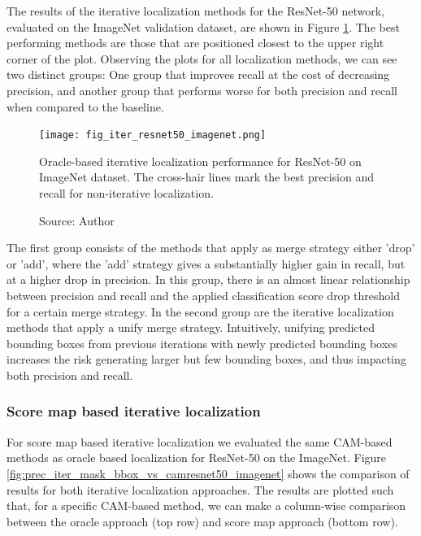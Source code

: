 The results of the iterative localization methods for the ResNet-50 network, evaluated on the ImageNet validation dataset, are shown in Figure \ref{fig:prec_iter_resnet50_imagenet}. The best performing methods are those that are positioned closest to the upper right corner of the plot. Observing the plots for all localization methods, we can see two distinct groups: One group that improves recall at the cost of decreasing precision, and another group that performs worse for both precision and recall when compared to the baseline.

\begin{figure}[h]
    \begin{center}       
    \texttt{[image: fig\_iter\_resnet50\_imagenet.png]}
    \caption[Oracle-based iterative localization performance for ResNet-50 on ImageNet dataset]{Oracle-based iterative localization performance for ResNet-50 on ImageNet dataset. The cross-hair lines mark the best precision and recall for non-iterative localization.}
    \caption*{Source: Author}
    \label{fig:prec_iter_resnet50_imagenet}
    \end{center}
\end{figure}

The first group consists of the methods that apply as merge strategy either 'drop' or 'add', where the 'add' strategy gives a substantially higher gain in recall, but at a higher drop in precision. In this group, there is an almost linear relationship between precision and recall and the applied classification score drop threshold for a certain merge strategy. In the second group are the iterative localization methods that apply a unify merge strategy. Intuitively, unifying predicted bounding boxes from previous iterations with newly predicted bounding boxes increases the risk generating larger but few bounding boxes, and thus impacting both precision and recall.

\subsubsection{Score map based iterative localization}

For score map based iterative localization we evaluated the same CAM-based methods as oracle based localization for ResNet-50 on the ImageNet. Figure \ref{fig:prec_iter_mask_bbox_vs_camresnet50_imagenet} shows the comparison of results for both iterative localization approaches. The results are plotted such that, for a specific CAM-based method, we can make a column-wise comparison between the oracle approach (top row) and score map approach (bottom row).

